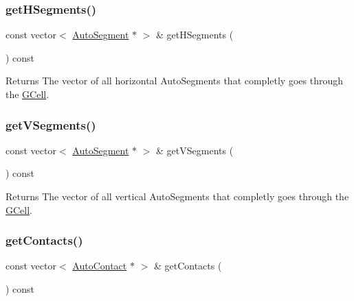 \subsubsection{\texorpdfstring{get\+H\+Segments()}{getHSegments()}}
{\footnotesize\ttfamily const vector$<$ \hyperlink{classKatabatic_1_1AutoSegment}{Auto\+Segment} $\ast$ $>$ \& get\+H\+Segments (\begin{DoxyParamCaption}{ }\end{DoxyParamCaption}) const\hspace{0.3cm}{\ttfamily [inline]}}

\begin{DoxyReturn}{Returns}
The vector of all horizontal Auto\+Segments that completly goes through the \hyperlink{classKatabatic_1_1GCell}{G\+Cell}. 
\end{DoxyReturn}
\mbox{\label{classKatabatic_1_1GCell_ac3c357d72a24990494758dcc216e3b1e}} 
\subsubsection{\texorpdfstring{get\+V\+Segments()}{getVSegments()}}
{\footnotesize\ttfamily const vector$<$ \hyperlink{classKatabatic_1_1AutoSegment}{Auto\+Segment} $\ast$ $>$ \& get\+V\+Segments (\begin{DoxyParamCaption}{ }\end{DoxyParamCaption}) const\hspace{0.3cm}{\ttfamily [inline]}}

\begin{DoxyReturn}{Returns}
The vector of all vertical Auto\+Segments that completly goes through the \hyperlink{classKatabatic_1_1GCell}{G\+Cell}. 
\end{DoxyReturn}
\mbox{\label{classKatabatic_1_1GCell_aacf50ce6dcef3a7523453725af7feeae}} 
\subsubsection{\texorpdfstring{get\+Contacts()}{getContacts()}}
{\footnotesize\ttfamily const vector$<$ \hyperlink{classKatabatic_1_1AutoContact}{Auto\+Contact} $\ast$ $>$ \& get\+Contacts (\begin{DoxyParamCaption}{ }\end{DoxyParamCaption}) const\hspace{0.3cm}{\ttfamily [inline]}}

